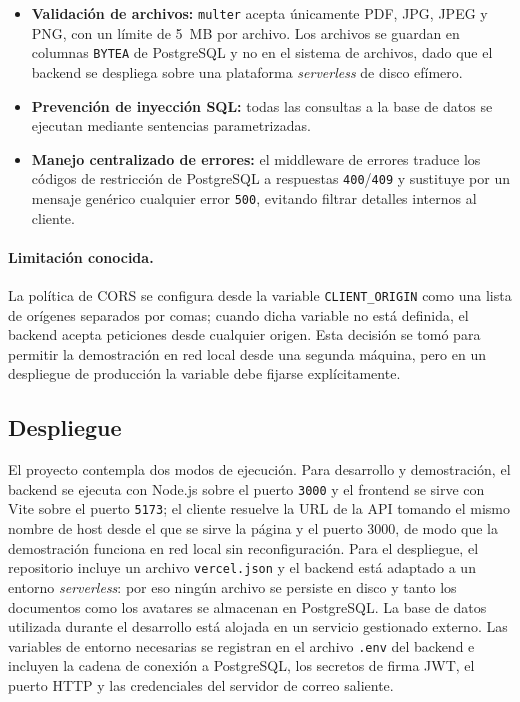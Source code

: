 \begin{itemize}
    un mensaje genérico.
    \item \textbf{Validación de archivos:} \texttt{multer} acepta únicamente
    PDF, JPG, JPEG y PNG, con un límite de 5~MB por archivo. Los archivos se
    guardan en columnas \texttt{BYTEA} de PostgreSQL y no en el sistema de
    archivos, dado que el backend se despliega sobre una plataforma
    \emph{serverless} de disco efímero.
    \item \textbf{Prevención de inyección SQL:} todas las consultas a la
    base de datos se ejecutan mediante sentencias parametrizadas.
    \item \textbf{Manejo centralizado de errores:} el middleware de errores
    traduce los códigos de restricción de PostgreSQL a respuestas
    \texttt{400}/\texttt{409} y sustituye por un mensaje genérico cualquier
    error \texttt{500}, evitando filtrar detalles internos al cliente.
\end{itemize}

\paragraph{Limitación conocida.} La política de CORS se configura desde la
variable \texttt{CLIENT\_ORIGIN} como una lista de orígenes separados por
comas; cuando dicha variable no está definida, el backend acepta peticiones
desde cualquier origen. Esta decisión se tomó para permitir la demostración
en red local desde una segunda máquina, pero en un despliegue de producción
la variable debe fijarse explícitamente.

\subsection{Despliegue}
El proyecto contempla dos modos de ejecución. Para desarrollo y demostración,
el backend se ejecuta con Node.js sobre el puerto \texttt{3000} y el frontend
se sirve con Vite sobre el puerto \texttt{5173}; el cliente resuelve la URL de
la API tomando el mismo nombre de host desde el que se sirve la página y el
puerto 3000, de modo que la demostración funciona en red local sin
reconfiguración. Para el despliegue, el repositorio incluye un archivo
\texttt{vercel.json} y el backend está adaptado a un entorno
\emph{serverless}: por eso ningún archivo se persiste en disco y tanto los
documentos como los avatares se almacenan en PostgreSQL. La base de datos
utilizada durante el desarrollo está alojada en un servicio gestionado
externo. Las variables de entorno necesarias se registran en el archivo
\texttt{.env} del backend e incluyen la cadena de conexión a PostgreSQL, los
secretos de firma JWT, el puerto HTTP y las credenciales del servidor de
correo saliente.

